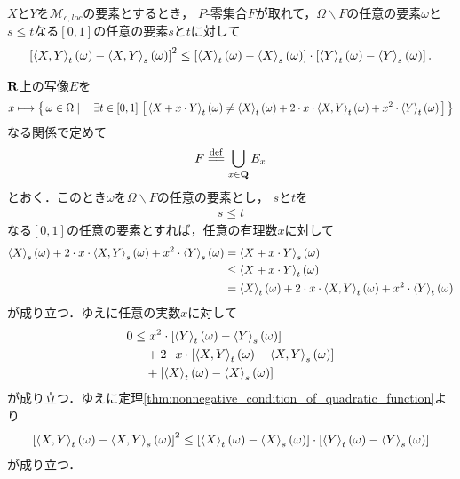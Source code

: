 	\begin{screen}
		\begin{thm}[二次変分に対するSchwartzの不等式]
		\label{thm:Schwartz_inequality_for_quadratic_variations}
			$X$と$Y$を$\mathscr{M}_{c,loc}$の要素とするとき，
			$P$-零集合$F$が取れて，$\Omega \backslash F$の任意の要素$\omega$と
			$s \leq t$なる$[0,1]$の任意の要素$s$と$t$に対して
			\begin{align}
				\left[\inprod<X,Y>_{t}(\omega) - \inprod<X,Y>_{s}(\omega)\right]^{2}
				\leq \left[\inprod<X>_{t}(\omega) - \inprod<X>_{s}(\omega)\right] 
				\cdot \left[\inprod<Y>_{t}(\omega) - \inprod<Y>_{s}(\omega)\right].
			\end{align}
		\end{thm}
	\end{screen}
	
	\begin{sketch}
		$\mathbf{R}$上の写像$E$を
		\begin{align}
			x \longmapsto \Set{\omega \in \Omega}{\exists t \in [0,1]\, \left[\, 
			\inprod<X+x \cdot Y>_{t}(\omega) \neq
			\inprod<X>_{t}(\omega) + 2 \cdot x \cdot \inprod<X,Y>_{t}(\omega)
			+ x^{2} \cdot \inprod<Y>_{t}(\omega)\, \right]}
		\end{align}
		なる関係で定めて
		\begin{align}
			F \defeq \bigcup_{x \in \Q} E_{x}
		\end{align}
		とおく．このとき$\omega$を$\Omega \backslash F$の任意の要素とし，
		$s$と$t$を
		\begin{align}
			s \leq t
		\end{align}
		なる$[0,1]$の任意の要素とすれば，任意の有理数$x$に対して
		\begin{align}
			\inprod<X>_{s}(\omega) + 2 \cdot x \cdot \inprod<X,Y>_{s}(\omega)
			+ x^{2} \cdot \inprod<Y>_{s}(\omega)
			&= \inprod<X+x \cdot Y>_{s}(\omega) \\
			&\leq \inprod<X+x \cdot Y>_{t}(\omega) \\
			&= \inprod<X>_{t}(\omega) + 2 \cdot x \cdot \inprod<X,Y>_{t}(\omega)
			+ x^{2} \cdot \inprod<Y>_{t}(\omega)
		\end{align}
		が成り立つ．ゆえに任意の実数$x$に対して
		\begin{align}
			0 &\leq x^{2} \cdot \left[\inprod<Y>_{t}(\omega) - \inprod<Y>_{s}(\omega) \right] \\
			&\quad + 2 \cdot x \cdot \left[\inprod<X,Y>_{t}(\omega) - \inprod<X,Y>_{s}(\omega) \right] \\
			&\quad + \left[\inprod<X>_{t}(\omega) - \inprod<X>_{s}(\omega) \right]
		\end{align}
		が成り立つ．ゆえに定理\ref{thm:nonnegative_condition_of_quadratic_function}より
		\begin{align}
			\left[\inprod<X,Y>_{t}(\omega) - \inprod<X,Y>_{s}(\omega)\right]^{2}
			\leq \left[\inprod<X>_{t}(\omega) - \inprod<X>_{s}(\omega)\right] \cdot
			\left[\inprod<Y>_{t}(\omega) - \inprod<Y>_{s}(\omega)\right]
		\end{align}
		が成り立つ．
		\QED
	\end{sketch}
	